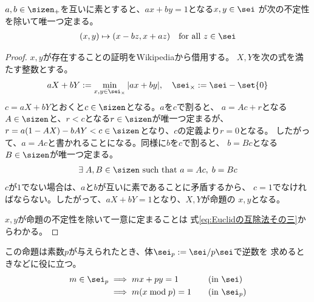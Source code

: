 {	\begin{proposition}[Bezoutの恒等式]\label{prop:Bezoutの恒等式} %
		$a,b\in\sizen_+$を互いに素とすると、$ax+by=1$となる$x,y\in\sei$
		が次の不定性を除いて唯一つ定まる。
		\begin{equation*}\begin{split}
			(x,y)\mapsto(x-bz,x+az) \quad\text{for all } z\in\sei
		\end{split}\end{equation*}
	\end{proposition} %
	\begin{proof} %
		$x,y$が存在することの証明をWikipediaから借用する。
		$X,Y$を次の式を満たす整数とする。
		\begin{equation*}\begin{split}
			aX+bY := \min_{x,y\in\sei_\times} |ax+by|
			,\quad \sei_\times := \sei - \set{0}
		\end{split}\end{equation*}
		$c=aX+bY$とおくと$c\in\sizen$となる。$a$を$c$で割ると、
		$a=Ac+r$となる$A\in\sizen$と、$r<c$となる$r\in\sizen$が唯一つ定まるが、
		$r=a(1-AX)-bAY<c\in\sizen$となり、$c$の定義より$r=0$となる。
		したがって、$a=Ac$と書かれることになる。同様に$b$を$c$で割ると、
		$b=Bc$となる$B\in\sizen$が唯一つ定まる。
		\begin{equation*}\begin{split}
			\exists\; A,B\in\sizen \text{ such that } a = Ac,\; b = Bc
		\end{split}\end{equation*}
		$c$が$1$でない場合は、$a$と$b$が互いに素であることに矛盾するから、
		$c=1$でなければならない。したがって、$aX+bY=1$となり、$X,Y$が命題の
		$x,y$となる。

		$x,y$が命題の不定性を除いて一意に定まることは
		式\eqref{eq:Euclidの互除法その三}からわかる。
	\end{proof} %

	この命題は素数$p$が与えられたとき、体$\sei_p:=\sei/p\sei$で逆数を
	求めるときなどに役に立つ。
	\begin{alignat*}{2}
		m\in\sei_p &\implies mx + py = 1 &\quad& \text{(in $\sei$)} \\
		&\implies m(x\bmod p) = 1 &\quad& \text{(in $\sei_p$)}
	\end{alignat*}

}
